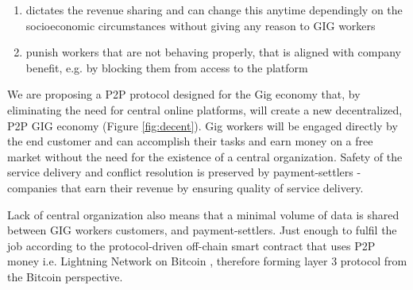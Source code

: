 \documentclass{article}
\begin{document}
\begin{enumerate}
\item dictates the revenue sharing and can change this anytime dependingly on the socioeconomic circumstances without giving any reason to GIG workers

\item punish workers that are not behaving properly, that is aligned with company benefit, e.g. by blocking them from access to the platform
\end{enumerate}

We are proposing a P2P protocol designed for the Gig economy that, by eliminating the need for central online platforms, will create a new decentralized, P2P GIG economy (Figure \ref{fig:decent}). Gig workers will be engaged directly by the end customer and can accomplish their tasks and earn money on a free market without the need for the existence of a central organization. Safety of the service delivery and conflict resolution is preserved by payment-settlers - companies that earn their revenue by ensuring quality of service delivery.

Lack of central organization also means that a minimal volume of data is shared between GIG workers customers, and payment-settlers. Just enough to fulfil the job according to the protocol-driven off-chain smart contract that uses P2P money i.e. Lightning Network \cite{poon2016bitcoin} on Bitcoin \cite{nakamoto2009bitcoin}, therefore forming layer 3 protocol from the Bitcoin perspective.
\end{document}

